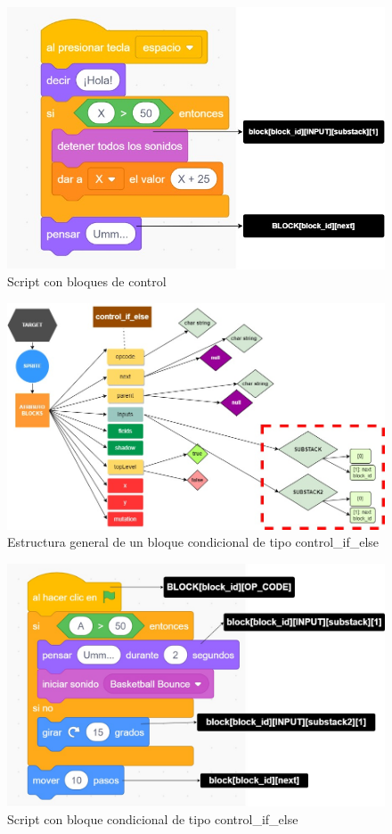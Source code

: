 \documentclass[a4paper, 12pt]{book}
\begin{document}
\begin{figure}
  \centering
  \includegraphics[width=13cm, keepaspectratio]{img/scratch_control.jpg}
  \caption{Script con bloques de control}
  \label{fig:scratch_control}
\end{figure}

\begin{figure}
  \centering
  \includegraphics[width=15cm, keepaspectratio]{img/controlblock_spe.jpg}
  \caption{Estructura general de un bloque condicional de tipo control\_if\_else}
  \label{fig:controlblock_spe}
\end{figure}

\begin{figure}
  \centering
  \includegraphics[width=13cm, keepaspectratio]{img/scratch_special.jpg}
  \caption{Script con bloque condicional de tipo control\_if\_else}
  \label{fig:scratch_special}
\end{figure}
\end{document}
